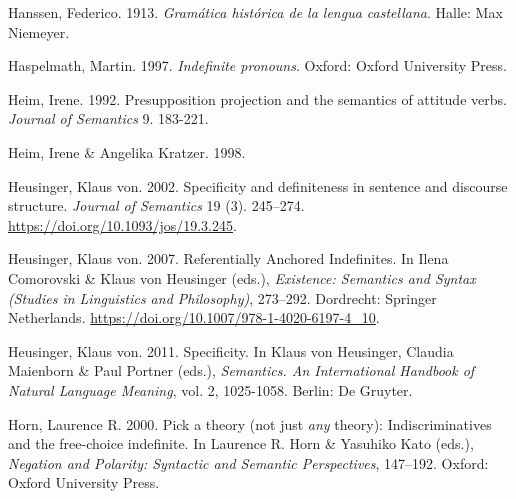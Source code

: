 \begin{styleLiteraturStandard}
Hanssen, Federico. 1913. \textit{Gramática histórica de la lengua castellana}. Halle: Max Niemeyer.
\end{styleLiteraturStandard}

\begin{styleStandard}
Haspelmath, Martin. 1997. \textit{Indefinite pronouns}. Oxford: Oxford University Press.
\end{styleStandard}

\begin{styleLiteraturStandard}
Heim, Irene. 1992. Presupposition projection and the semantics of attitude verbs. \textit{Journal of Semantics} 9. 183-221.
\end{styleLiteraturStandard}

\begin{styleStandard}
Heim, Irene \& Angelika Kratzer. 1998. 
\end{styleStandard}

\begin{styleStandard}
Heusinger, Klaus von. 2002. Specificity and definiteness in sentence and discourse structure. \textit{Journal of Semantics} 19 (3). 245–274. \url{https://doi.org/10.1093/jos/19.3.245}.
\end{styleStandard}

\begin{styleStandard}
Heusinger, Klaus von. 2007. Referentially Anchored Indefinites. In Ilena Comorovski \& Klaus von Heusinger (eds.), \textit{Existence: Semantics and Syntax} \textit{(Studies in Linguistics and Philosophy)}, 273–292. Dordrecht: Springer Netherlands. \url{https://doi.org/10.1007/978-1-4020-6197-4_10}. 
\end{styleStandard}

\begin{styleStandard}
Heusinger, Klaus von. 2011. Specificity. In Klaus von Heusinger, Claudia Maienborn \& Paul Portner (eds.), \textit{Semantics. An International Handbook of Natural Language Meaning},\textit{ }vol. 2, 1025-1058. Berlin: De Gruyter.
\end{styleStandard}

\begin{styleStandard}
Horn, Laurence R. 2000. Pick a theory (not just \textit{any} theory): Indiscriminatives and the free-choice indefinite. In Laurence R. Horn \& Yasuhiko Kato (eds.), \textit{Negation and Polarity: Syntactic and Semantic Perspectives}, 147–192. Oxford: Oxford University Press.
\end{styleStandard}

